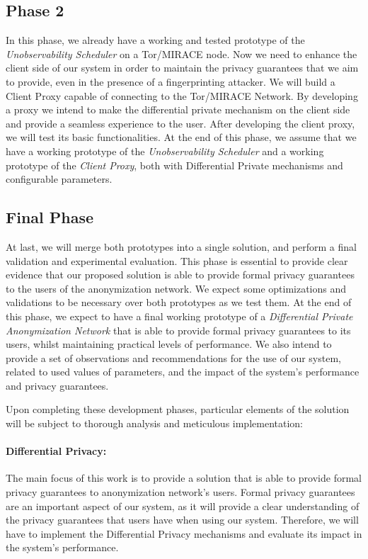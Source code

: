 \subsection{Phase 2}

In this phase, we already have a working and tested prototype of the \textit{Unobservability Scheduler} on a Tor/MIRACE node. Now we need to enhance the client side of our system in order to maintain the privacy guarantees that we aim to provide, even in the presence of a fingerprinting attacker. We will build a Client Proxy capable of connecting to the Tor/MIRACE Network. By developing a proxy we intend to make the differential private mechanism on the client side and provide a seamless experience to the user. After developing the client proxy, we will test its basic functionalities. At the end of this phase, we assume that we have a working prototype of the \textit{Unobservability Scheduler} and a working prototype of the \textit{Client Proxy}, both with Differential Private mechanisms and configurable parameters.  

\subsection{Final Phase}
At last, we will merge both prototypes into a single solution, and perform a final validation and experimental evaluation. This phase is essential to provide clear evidence that our proposed solution is able to provide formal privacy guarantees to the users of the anonymization network. We expect some optimizations and validations to be necessary over both prototypes as we test them. At the end of this phase, we expect to have a final working prototype of a \textit{Differential Private Anonymization Network} that is able to provide formal privacy guarantees to its users, whilst maintaining practical levels of performance. We also intend to provide a set of observations and recommendations for the use of our system, related to used values of parameters, and the impact of the system's performance and privacy guarantees.


Upon completing these development phases, particular elements of the solution will be subject to thorough analysis and meticulous implementation:
\paragraph{Differential Privacy:} The main focus of this work is to provide a solution that is able to provide formal privacy guarantees to anonymization network's users. Formal privacy guarantees are an important aspect of our system, as it will provide a clear understanding of the privacy guarantees that users have when using our system. Therefore, we will have to implement the Differential Privacy mechanisms and evaluate its impact in the system's performance.
